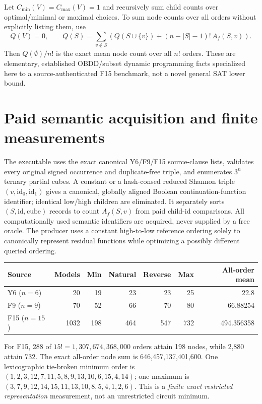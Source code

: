 \documentclass[11pt]{article}
\begin{document}
Let $C_{\min}(V)=C_{\max}(V)=1$ and recursively sum child counts over optimal/minimal or maximal choices. To sum node counts over all orders without explicitly listing them, use
\[
 Q(V)=0,\qquad Q(S)=\sum_{v\notin S}\left(Q(S\cup\{v\})+(n-|S|-1)!\,A_f(S,v)\right).
\]
Then $Q(\emptyset)/n!$ is the exact mean node count over all $n!$ orders. These are elementary, established OBDD/subset dynamic programming facts specialized here to a source-authenticated F15 benchmark, not a novel general SAT lower bound.

\section{Paid semantic acquisition and finite measurements}
The executable uses the exact canonical Y6/F9/F15 source-clause lists, validates every original signed occurrence and duplicate-free triple, and enumerates $3^n$ ternary partial cubes. A constant or a hash-consed reduced Shannon triple $(v,\mathrm{id}_0,\mathrm{id}_1)$ gives a canonical, globally aligned Boolean continuation-function identifier; identical low/high children are eliminated. It separately sorts $(S,\mathrm{id},\text{cube})$ records to count $A_f(S,v)$ from paid child-id comparisons. All computationally used semantic identifiers are acquired, never supplied by a free oracle. The producer uses a constant high-to-low reference ordering solely to canonically represent residual functions while optimizing a possibly different queried ordering.

\begin{center}
\begin{tabular}{lrrrrrr}
\toprule
Source & Models & Min & Natural & Reverse & Max & All-order mean\\
\midrule
Y6 ($n=6$) &20&19&23&23&25&22.8\\
F9 ($n=9$) &70&52&66&70&80&66.88254\\
F15 ($n=15$) &1032&198&464&547&732&494.356358\\
\bottomrule
\end{tabular}
\end{center}
For F15, 288 of $15!=1{,}307{,}674{,}368{,}000$ orders attain 198 nodes, while 2,880 attain 732. The exact all-order node sum is 646,457,137,401,600. One lexicographic tie-broken minimum order is $(1,2,3,12,7,11,5,8,9,13,10,6,15,4,14)$; one maximum is $(3,7,9,12,14,15,11,13,10,8,5,4,1,2,6)$. This is a \emph{finite exact restricted representation} measurement, not an unrestricted circuit minimum.
\end{document}
